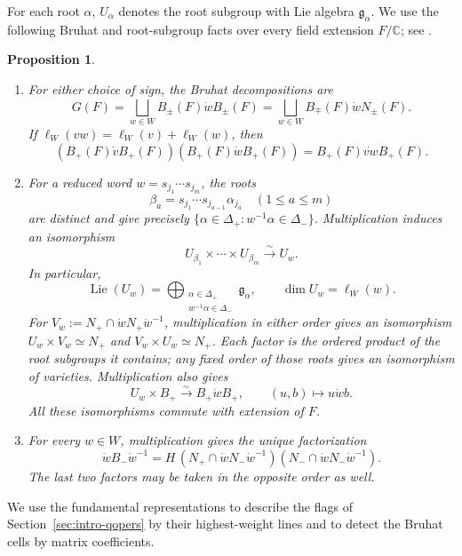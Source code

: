 \documentclass[11pt,leqno]{amsart}
\numberwithin{equation}{section}
\theoremstyle{plain}
\newtheorem{proposition}[theorem]{Proposition}
\theoremstyle{definition}
\theoremstyle{plain}
\theoremstyle{definition}
\theoremstyle{remark}
\newcommand{\g}{\mathfrak g}
\begin{document}
For each root $\alpha$, $U_\alpha$ denotes the root subgroup with Lie algebra
$\g_\alpha$.  We use the following Bruhat and root-subgroup facts over every
field extension $F/\mathbb C$; see
\cite[Theorem~21.68, Remark~21.69, Proposition~21.77, Lemma~21.78 and
Theorem~21.80]{Milne2017}.
\begin{proposition}\label{prop:Bruhat-root-factorization}
\begin{enumerate}[label=(\alph*),topsep=3pt,itemsep=4pt]
\item For either choice of sign, the Bruhat decompositions are
\[
 G(F)=\bigsqcup_{w\in W}B_\pm(F)\dot wB_\pm(F)
     =\bigsqcup_{w\in W}B_\mp(F)\dot wN_\pm(F).
\]
If $\ell_W(vw)=\ell_W(v)+\ell_W(w)$, then
\[
 (B_+(F)\dot vB_+(F))(B_+(F)\dot wB_+(F))
 =B_+(F)\dot{vw}B_+(F).
\]
\item For a reduced word $w=s_{j_1}\cdots s_{j_m}$, the roots
\[
 \beta_a=s_{j_1}\cdots s_{j_{a-1}}\alpha_{j_a}
 \quad(1\le a\le m)
\]
are distinct and give precisely
$\{\alpha\in\Delta_+:w^{-1}\alpha\in\Delta_-\}$.  Multiplication induces
an isomorphism
\[
 U_{\beta_1}\times\cdots\times U_{\beta_m}\xrightarrow{\sim}U_w.
\]
In particular,
\[
 \operatorname{Lie}(U_w)=
 \bigoplus_{\substack{\alpha\in\Delta_+\\w^{-1}\alpha\in\Delta_-}}\g_\alpha,
 \qquad \dim U_w=\ell_W(w).
\]
For $V_w:=N_+\cap\dot wN_+\dot w^{-1}$, multiplication in either order
gives an isomorphism $U_w\times V_w\simeq N_+$ and
$V_w\times U_w\simeq N_+$.  Each factor is the ordered product of the
root subgroups it contains; any fixed order of those roots gives an
isomorphism of varieties.  Multiplication also gives
\[
 U_w\times B_+\xrightarrow{\sim}B_+\dot wB_+,
 \qquad (u,b)\longmapsto u\dot wb.
\]
All these isomorphisms commute with extension of $F$.
\item For every $w\in W$, multiplication gives the unique factorization
\[
 \dot wB_-\dot w^{-1}
 =H\,(N_+\cap\dot wN_-\dot w^{-1})
       (N_-\cap\dot wN_-\dot w^{-1}).
\]
The last two factors may be taken in the opposite order as well.
\end{enumerate}
\end{proposition}

We use the fundamental representations to describe the flags of Section~\ref{sec:intro-qopers} by their highest-weight lines and to detect the Bruhat cells by matrix coefficients.
\end{document}
